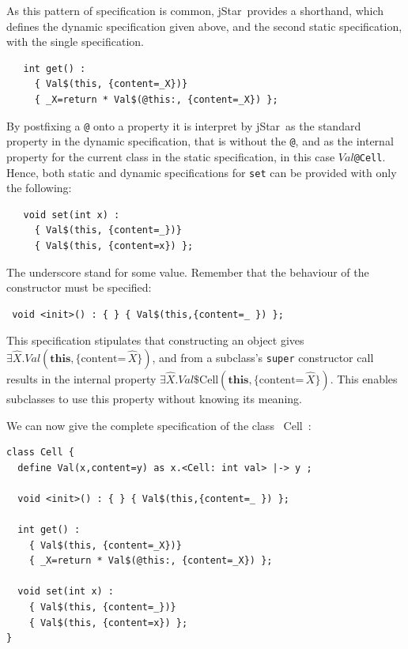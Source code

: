 \documentclass[11pt]{article}
\newcommand{\jStar}{{\sf jStar}}
\newcommand{\Val}{\mathit{Val}}
\newcommand{\ex}[1]{\mathord{\hat{#1}}}
\newcommand{\content}[1]{\{\text{content=} \, #1 \}}
\newcommand{\this}{\mathbf{this}}
\def\J{\lstinline}
\newcommand{\JS}[1]{$\mathit{#1}$}
\begin{document}
As this pattern of specification is common, \jStar \ provides a shorthand,
which defines the dynamic specification given above, and the second
static specification, with the single specification.
%
\begin{verbatim}
   int get() : 
     { Val$(this, {content=_X})} 
     { _X=return * Val$(@this:, {content=_X}) };
\end{verbatim}
By postfixing a \J~@~ onto a property it is interpret by \jStar \ as the
standard property in the dynamic specification, that is without the
\J~@~, and as the internal property for the current class in the
static specification, in this case \JS{Val}\J~@Cell~.
%
Hence, both static and dynamic specifications for \J~set~  can be provided with only the following: 
\begin{verbatim}
   void set(int x) : 
     { Val$(this, {content=_})} 
     { Val$(this, {content=x}) };
 \end{verbatim}
 The underscore stand for some value.
Remember that the behaviour of the constructor must be specified:
%
\begin{verbatim}
 void <init>() : { } { Val$(this,{content=_ }) };
\end{verbatim}
This specification stipulates that constructing an object gives
$\exists \ex X.\Val(\this,\content{\ex X})$, and from a subclass's \J~super~
constructor call results in the internal property
$\exists \ex X.\Val\mbox{\$Cell}(\this,\content{\ex X})$.  This enables subclasses
to use this property without knowing its meaning.

We can now give the complete specification of the class \JS~Cell~:
\begin{verbatim}
class Cell {
  define Val(x,content=y) as x.<Cell: int val> |-> y ;

  void <init>() : { } { Val$(this,{content=_ }) };
  
  int get() : 
    { Val$(this, {content=_X})} 
    { _X=return * Val$(@this:, {content=_X}) };

  void set(int x) : 
    { Val$(this, {content=_})} 
    { Val$(this, {content=x}) };
}
\end{verbatim}
\end{document}
